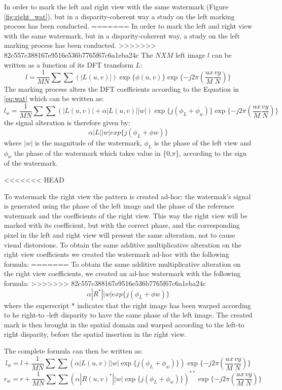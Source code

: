 In order to mark the left and right view with the same watermark (Figure \ref{fig:right_wat}), but in a disparity-coherent way a study on the left marking process has been conducted.
=======
In order to mark the left and right view with the same watermark, but in a disparity-coherent way, a study on the left marking process has been conducted.
>>>>>>> 82c557c388167e9516e536b7765f67c6a1eba24c
The $NXM$ left image $l$ can be written as a function of its DFT transform $L$:
$$ l =  \frac{1}{MN}\sum\sum(|L(u,v)|)\exp\{\phi (u,v)\} \exp\{-j2\pi(\frac{ux}{M}\frac{vy}{N})\}  $$
The marking process alters the DFT coefficients according to the Equation in \ref{eq:wat}
which can be written as:
$$ l_{w} = \frac{1}{MN}\sum\sum(|L(u,v)| + \alpha|L(u,v)||w|)\exp\{j(\phi_{L}+\phi_{w})\}\exp\{-j2\pi(\frac{ux}{M}\frac{vy}{N})\} $$
the signal alteration is therefore given by:
$$ \alpha|L||w|exp\{j(\phi_{L}+\phi{w})\} $$ 
where $|w|$ is the magnitude of the watermark, $\phi_{L}$ is the phase of the left view and $ \phi_{w}$ the phase of the watermark which takes value in \{0,$\pi$\}, according to the sign of the watermark.

<<<<<<< HEAD

To watermark the right view the pattern is created ad-hoc: the watermak's signal is generated using the phase of the left image and the phase of the reference watermark and  the coefficients of the right view.\newline  
This way the right view will be marked with its coefficient, but with the correct phase, and the corresponding pixel in the left and right view will present the same alteration, not to cause visual distorsions.
To obtain the same additive multiplicative alteration on the right view coefficients we created the watermark ad-hoc with the following formula: 
=======
To obtain the same additive multiplicative alteration on the right view coefficients, we created an ad-hoc watermark with the following formula: 
>>>>>>> 82c557c388167e9516e536b7765f67c6a1eba24c
$$ \alpha|R^{*}||w|exp\{j(\phi_{L}+\phi{w})\} $$ 
where the superscript * indicates that the right image has been warped according to he right-to -left disparity to have the same phase of the left image.
The created mark is then brought in the spatial domain and warped according to the left-to right disparity, before the spatial insertion in the right view.



The complete formula can then be written as: 
$$ l_{w} = l + \frac{1}{MN}\sum\sum(\alpha|L(u,v)||w|\exp\{j(\phi_{L}+\phi_{w})\})\exp\{-j2\pi(\frac{ux}{M}\frac{vy}{N})\} $$
$$ r_{w} = r + \frac{1}{MN}\sum\sum(\alpha|R(u,v)^{*}||w|\exp\{j(\phi_{L}+\phi_{w})\})^{**}\exp\{-j2\pi(\frac{ux}{M}\frac{vy}{N})\} $$


